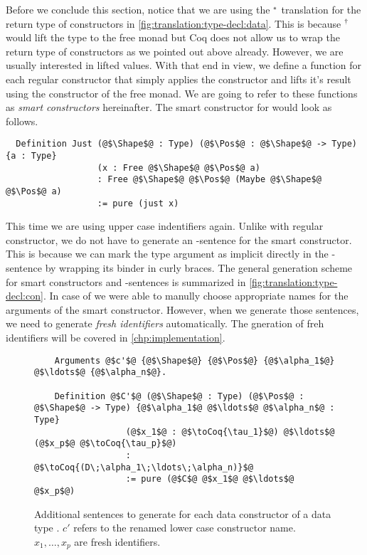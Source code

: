 Before we conclude this section, notice that we are using the ${}^{*}$ translation for the return type of constructors in \autoref{fig:translation:type-decl:data}.
This is because ${}^{\dagger}$ would lift the type to the free monad but Coq does not allow us to wrap the return type of constructors as we pointed out above already.
However, we are usually interested in lifted values.
With that end in view, we define a function for each regular constructor that simply applies the constructor and lifts it's result using the  constructor of the free monad.
We are going to refer to these functions as \textit{smart constructors} hereinafter.
The smart constructor for  would look as follows.
\begin{verbatim}
  Definition Just (@$\Shape$@ : Type) (@$\Pos$@ : @$\Shape$@ -> Type) {a : Type}
                  (x : Free @$\Shape$@ @$\Pos$@ a)
                  : Free @$\Shape$@ @$\Pos$@ (Maybe @$\Shape$@ @$\Pos$@ a)
                  := pure (just x)
\end{verbatim}
This time we are using upper case indentifiers again.
Unlike with regular constructor, we do not have to generate an -sentence for the smart constructor.
This is because we can mark the type argument as implicit directly in the -sentence by wrapping its binder in curly braces.
The general generation scheme for smart constructors and -sentences is summarized in \autoref{fig:translation:type-decl:con}.
In case of  we were able to manully choose appropriate names for the arguments of the smart constructor.
However, when we generate those sentences, we need to generate \textit{fresh identifiers} automatically.
The gneration of freh identifiers will be covered in \autoref{chp:implementation}. %

\begin{figure}[H]
  \begin{verbatim}
    Arguments @$c'$@ {@$\Shape$@} {@$\Pos$@} {@$\alpha_1$@} @$\ldots$@ {@$\alpha_n$@}.

    Definition @$C'$@ (@$\Shape$@ : Type) (@$\Pos$@ : @$\Shape$@ -> Type) {@$\alpha_1$@ @$\ldots$@ @$\alpha_n$@ : Type}
                  (@$x_1$@ : @$\toCoq{\tau_1}$@) @$\ldots$@ (@$x_p$@ @$\toCoq{\tau_p}$@)
                  : @$\toCoq{(D\;\alpha_1\;\ldots\;\alpha_n)}$@
                  := pure (@$C$@ @$x_1$@ @$\ldots$@ @$x_p$@)
  \end{verbatim}
  \caption{Additional sentences to generate for each data constructor  of a data type . $c'$ refers to the renamed lower case constructor name. $x_1, \ldots, x_p$ are fresh identifiers.}
  \label{fig:translation:type-decl:con}
\end{figure}

